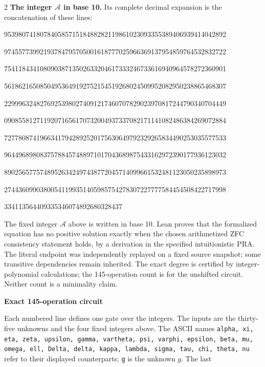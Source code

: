 \documentclass[10pt]{article}
\begin{document}
\begin{multicols}{2}
\textbf{The integer $\mathcal A$ in base 10.}
Its complete decimal expansion is the concatenation of these lines:\par
\begingroup\fontsize{7.7}{8.2}\selectfont{}\par
95398074180784058571518488282119861023093355389406939414042892\par
97455773992193784795705001618777025966369137954859764532832722\par
75411843410809038713502633204617333246733616940964578272360901\par
56186216508504953649192752154519268024509952082950238865468307\par
22999632482769253980274091217460707829023970817244790340704449\par
09085581271192071656170732004937337082171141082486384269072884\par
72778087419663417942892520175630649792329265834490253035577533\par
96449689808375788457488971017043689875433162972390177936123032\par
89025657757489526342497438772045714099661532481123050235898973\par
27443609903800541199351405985754278307227777584454508422717998\par
334113564409335346074892680328437\par
\endgroup
\normalfont\fontsize{7.7}{8.2}\selectfont
The fixed integer $\mathcal A$ above is written in base 10. Lean proves that the formalized equation has no positive solution exactly
when the chosen arithmetized ZFC consistency statement holds, by a derivation
in the specified intuitionistic PRA. The literal endpoint was independently
replayed on a fixed source snapshot; some transitive dependencies remain
inherited. The exact degree is certified by integer-polynomial calculations;
the 145-operation count is for the unshifted circuit. Neither count is a
minimality claim.
\end{multicols}
\clearpage
\begin{center}{\large\bfseries Exact 145-operation circuit}\end{center}
Each numbered line defines one gate over the integers. The inputs are the
thirty-five unknowns and the four fixed integers above. The ASCII names
\texttt{alpha, xi, eta, zeta, upsilon, gamma, vartheta, psi, varphi, epsilon, beta, mu, omega, ell, Delta, delta, kappa, lambda, sigma, tau, chi, theta, nu}
refer to their displayed counterparts; \texttt{g} is the unknown $g$. The last
\end{document}
